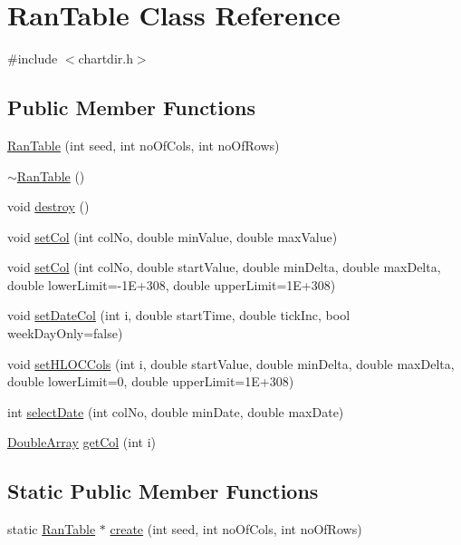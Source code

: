 \hypertarget{class_ran_table}{}\section{Ran\+Table Class Reference}
\label{class_ran_table}


{\ttfamily \#include $<$chartdir.\+h$>$}

\subsection*{Public Member Functions}
\begin{DoxyCompactItemize}
\item 
\hyperlink{class_ran_table_aecefc03f8c280f15116227515aaf3d78}{Ran\+Table} (int seed, int no\+Of\+Cols, int no\+Of\+Rows)
\item 
\hyperlink{class_ran_table_ab3c6f7f8bee3d017cd857cdf731dec24}{$\sim$\+Ran\+Table} ()
\item 
void \hyperlink{class_ran_table_a221cd11c0733ba1cd5130b6dc7367cb0}{destroy} ()
\item 
void \hyperlink{class_ran_table_a5f1d2400ce4a5c3c2d221cf04e27982c}{set\+Col} (int col\+No, double min\+Value, double max\+Value)
\item 
void \hyperlink{class_ran_table_a7d3124584c2fec6e029e1fc23771570f}{set\+Col} (int col\+No, double start\+Value, double min\+Delta, double max\+Delta, double lower\+Limit=-\/1\+E+308, double upper\+Limit=1\+E+308)
\item 
void \hyperlink{class_ran_table_a43a91048df7d3dcdeebe4342a6c6b514}{set\+Date\+Col} (int i, double start\+Time, double tick\+Inc, bool week\+Day\+Only=false)
\item 
void \hyperlink{class_ran_table_a7df8569529d0bda58899803aa8972f38}{set\+H\+L\+O\+C\+Cols} (int i, double start\+Value, double min\+Delta, double max\+Delta, double lower\+Limit=0, double upper\+Limit=1\+E+308)
\item 
int \hyperlink{class_ran_table_aa489b68e8f30adb5ee5a38ffef4209b0}{select\+Date} (int col\+No, double min\+Date, double max\+Date)
\item 
\hyperlink{class_double_array}{Double\+Array} \hyperlink{class_ran_table_a98c2e1df04ab232b51c6f089a411f99f}{get\+Col} (int i)
\end{DoxyCompactItemize}
\subsection*{Static Public Member Functions}
\begin{DoxyCompactItemize}
\item 
static \hyperlink{class_ran_table}{Ran\+Table} $\ast$ \hyperlink{class_ran_table_a19c9e0d90c39fa3e4b88e21d74622186}{create} (int seed, int no\+Of\+Cols, int no\+Of\+Rows)
\end{DoxyCompactItemize}


